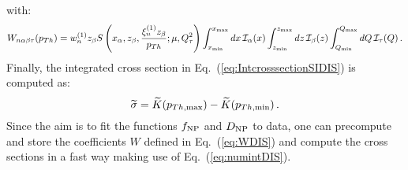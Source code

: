 \documentclass[10pt,a4paper]{article}
\begin{document}
with:
\begin{equation}\label{eq:WDIS}
 W_{n\alpha\beta\tau}(p_{Th}) = 
                                         w_n^{(1)} z_\beta S\left(x_\alpha,z_\beta,\frac{\xi_n^{(1)}z_\beta}{p_{Th}};\mu,Q_\tau^2\right) \int_{x_{\rm min}}^{x_{\rm
                                            max}}dx\,  \mathcal{I}_\alpha(x)\int_{z_{\rm min}}^{z_{\rm max}}dz\,
                                         \mathcal{I}_\beta(z)\int_{Q_{\rm min}}^{Q_{\rm
                                            max}}dQ\,\mathcal{I}_\tau(Q)\,.
\end{equation}
Finally, the integrated cross section in
Eq.~(\ref{eq:IntcrosssectionSIDIS}) is computed as:
\begin{equation}
\widetilde{\sigma} = \widetilde{K}(p_{Th,\rm max}) - \widetilde{K}(p_{Th,\rm min})\,.
\end{equation}
Since the aim is to fit the functions $f_{\rm NP}$ and $D_{\rm NP}$ to
data, one can precompute and store the coefficients $W$ defined in
Eq.~(\ref{eq:WDIS}) and compute the cross sections in a fast way
making use of Eq.~(\ref{eq:numintDIS}).
\end{document}
